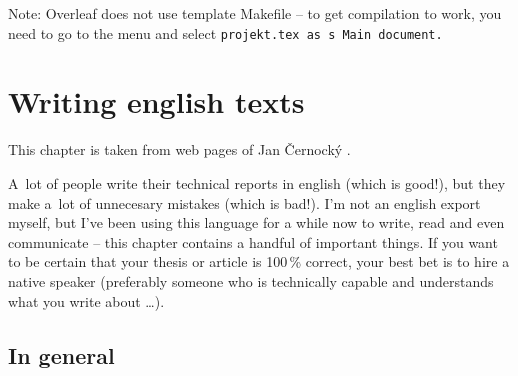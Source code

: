 Note: Overleaf does not use template Makefile -- to get compilation to work, you need to go to the menu and select \tt projekt.tex \rm as s~Main document.

\chapter{Writing english texts}
\label{anglicky}
This chapter is taken from web pages of Jan Černocký \cite{CernockyEnglish}.

A~lot of people write their technical reports in english (which is good!), but they make a~lot of unnecesary mistakes (which is bad!). I'm not an english export myself, but I've been using this language for a while now to write, read and even communicate -- this chapter contains a handful of important things. If you want to be certain that your thesis or article is 100\,\% correct, your best bet is to hire a native speaker (preferably someone who is technically capable and understands what you write about \ldots).


\section*{In general}

